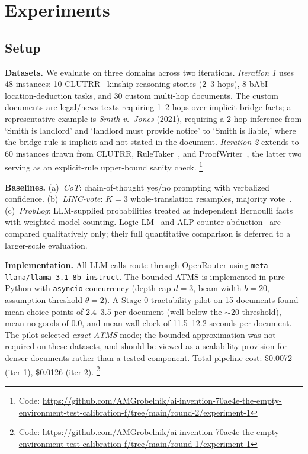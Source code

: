 \documentclass[11pt,letterpaper]{article}
\begin{document}
\section{Experiments}
\label{sec:experiments}

\subsection{Setup}

\noindent\textbf{Datasets.} We evaluate on three domains across two iterations. \emph{Iteration 1} uses
48 instances: 10 CLUTRR~\citep{Sinha2019} kinship-reasoning stories (2--3 hops), 8
bAbI~\citep{Weston2015} location-deduction tasks, and 30 custom multi-hop documents. The custom
documents are legal/news texts requiring 1--2 hops over implicit bridge facts; a representative example
is \emph{Smith v.\ Jones} (2021), requiring a 2-hop inference from `Smith is landlord' and `landlord
must provide notice' to `Smith is liable,' where the bridge rule is implicit and not stated in the
document. \emph{Iteration 2} extends to 60 instances drawn from CLUTRR, RuleTaker~\citep{Clark2020},
and ProofWriter~\citep{Tafjord2021}, the latter two serving as an explicit-rule upper-bound sanity
check.%
\footnote{Code: \url{https://github.com/AMGrobelnik/ai-invention-70ae4e-the-empty-environment-test-calibration-f/tree/main/round-2/experiment-1}}

\noindent\textbf{Baselines.}
(a)~\emph{CoT}: chain-of-thought yes/no prompting with verbalized confidence.
(b)~\emph{LINC-vote}: $K=3$ whole-translation resamples, majority vote~\citep{Olausson2023}.
(c)~\emph{ProbLog}: LLM-supplied probabilities treated as independent Bernoulli facts with weighted
model counting. Logic-LM~\citep{Pan2023} and ALP counter-abduction~\citep{Galitsky2026} are compared
qualitatively only; their full quantitative comparison is deferred to a larger-scale evaluation.

\noindent\textbf{Implementation.} All LLM calls route through OpenRouter using
\texttt{meta-llama/llama-3.1-8b-instruct}. The bounded ATMS is implemented in pure Python with
\texttt{asyncio} concurrency (depth cap $d=3$, beam width $b=20$, assumption threshold $\theta=2$). A
Stage-0 tractability pilot on 15 documents found mean choice points of 2.4--3.5 per document (well
below the $\sim$20 threshold), mean no-goods of 0.0, and mean wall-clock of 11.5--12.2 seconds per
document. The pilot selected \emph{exact ATMS} mode; the bounded approximation was not required on
these datasets, and should be viewed as a scalability provision for denser documents rather than a
tested component. Total pipeline cost: \$0.0072 (iter-1), \$0.0126 (iter-2).%
\footnote{Code: \url{https://github.com/AMGrobelnik/ai-invention-70ae4e-the-empty-environment-test-calibration-f/tree/main/round-1/experiment-1}}
\end{document}
